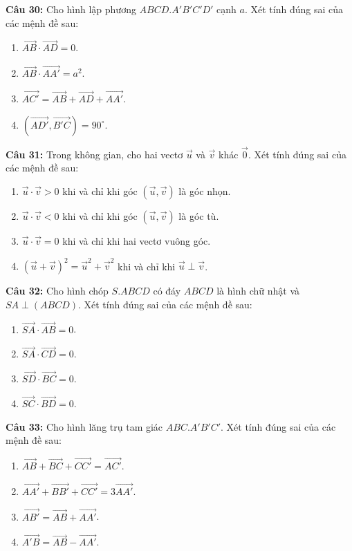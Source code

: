 \documentclass[12pt]{article}
\begin{document}
	\vspace{0.2cm}
	\noindent \textbf{Câu 30:} Cho hình lập phương $ABCD.A'B'C'D'$ cạnh $a$. Xét tính đúng sai của các mệnh đề sau:
	\begin{enumerate}[label=\alph*)]
		\item $\overrightarrow{AB} \cdot \overrightarrow{AD} = 0$.
		\item $\overrightarrow{AB} \cdot \overrightarrow{AA'} = a^2$.
		\item $\overrightarrow{AC'} = \overrightarrow{AB} + \overrightarrow{AD} + \overrightarrow{AA'}$.
		\item $(\overrightarrow{AD'}, \overrightarrow{B'C}) = 90^\circ$.
	\end{enumerate}
	
	\vspace{0.2cm}
	\noindent \textbf{Câu 31:} Trong không gian, cho hai vectơ $\vec{u}$ và $\vec{v}$ khác $\vec{0}$. Xét tính đúng sai của các mệnh đề sau:
	\begin{enumerate}[label=\alph*)]
		\item $\vec{u} \cdot \vec{v} > 0$ khi và chỉ khi góc $(\vec{u}, \vec{v})$ là góc nhọn.
		\item $\vec{u} \cdot \vec{v} < 0$ khi và chỉ khi góc $(\vec{u}, \vec{v})$ là góc tù.
		\item $\vec{u} \cdot \vec{v} = 0$ khi và chỉ khi hai vectơ vuông góc.
		\item $(\vec{u} + \vec{v})^2 = \vec{u}^2 + \vec{v}^2$ khi và chỉ khi $\vec{u} \perp \vec{v}$.
	\end{enumerate}
	
	\vspace{0.2cm}
	\noindent \textbf{Câu 32:} Cho hình chóp $S.ABCD$ có đáy $ABCD$ là hình chữ nhật và $SA \perp (ABCD)$. Xét tính đúng sai của các mệnh đề sau:
	\begin{enumerate}[label=\alph*)]
		\item $\overrightarrow{SA} \cdot \overrightarrow{AB} = 0$.
		\item $\overrightarrow{SA} \cdot \overrightarrow{CD} = 0$.
		\item $\overrightarrow{SD} \cdot \overrightarrow{BC} = 0$.
		\item $\overrightarrow{SC} \cdot \overrightarrow{BD} = 0$.
	\end{enumerate}
	
	\vspace{0.2cm}
	\noindent \textbf{Câu 33:} Cho hình lăng trụ tam giác $ABC.A'B'C'$. Xét tính đúng sai của các mệnh đề sau:
	\begin{enumerate}[label=\alph*)]
		\item $\overrightarrow{AB} + \overrightarrow{BC} + \overrightarrow{CC'} = \overrightarrow{AC'}$.
		\item $\overrightarrow{AA'} + \overrightarrow{BB'} + \overrightarrow{CC'} = 3\overrightarrow{AA'}$.
		\item $\overrightarrow{AB'} = \overrightarrow{AB} + \overrightarrow{AA'}$.
		\item $\overrightarrow{A'B} = \overrightarrow{AB} - \overrightarrow{AA'}$.
	\end{enumerate}
	
\end{document}
